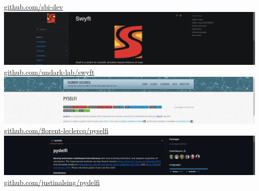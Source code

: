 \documentclass[aspectratio=169]{beamer}
\begin{document}
\begin{frame}
\begin{columns}
        \href{https://github.com/sbi-dev}{github.com/sbi-dev}
        \includegraphics[width=\textwidth]{figures/swyft_screenshot}
        \href{https://github.com/undark-lab/swyft}{github.com/undark-lab/swyft}
        \includegraphics[width=\textwidth]{figures/selfi_screenshot}
        \href{https://github.com/florent-leclercq/pyselfi}{github.com/florent-leclercq/pyselfi}
        \includegraphics[width=\textwidth]{figures/delfi_screenshot}
        \href{https://github.com/justinalsing/pydelfi}{github.com/justinalsing/pydelfi}
    \end{columns}
\end{frame}
\end{document}
